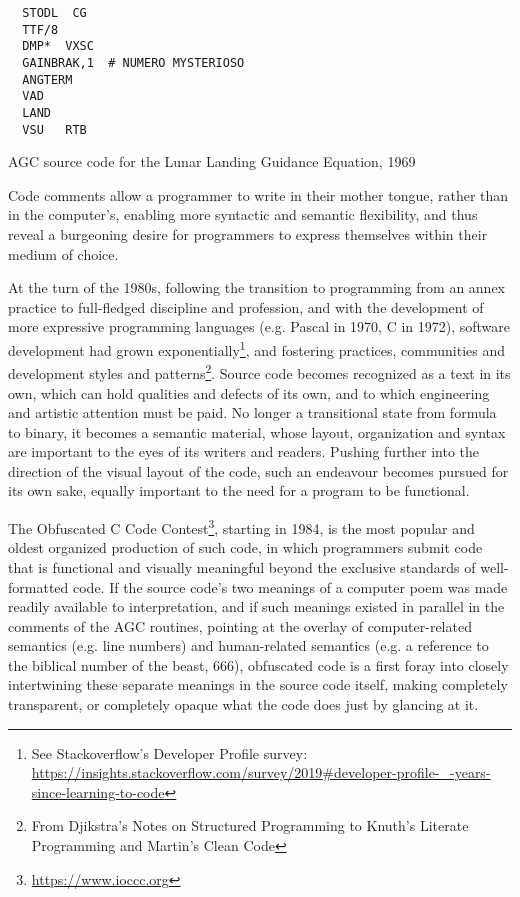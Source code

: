 \begin{listing}
  \begin{verbatim}
  STODL  CG
  TTF/8
  DMP*  VXSC
  GAINBRAK,1  # NUMERO MYSTERIOSO
  ANGTERM
  VAD
  LAND
  VSU	RTB
  \end{verbatim}
  \caption{AGC source code for the Lunar Landing Guidance Equation, 1969}
  \label{code:numero_mysterioso_asm}
\end{listing}

Code comments allow a programmer to write in their mother tongue, rather than in the computer's, enabling more syntactic and semantic flexibility, and thus reveal a burgeoning desire for programmers to express themselves within their medium of choice.

At the turn of the 1980s, following the transition to programming from an annex practice to full-fledged discipline and profession, and with the development of more expressive programming languages (e.g. Pascal in 1970, C in 1972), software development had grown exponentially\footnote{See Stackoverflow's Developer Profile survey: \url{https://insights.stackoverflow.com/survey/2019\#developer-profile-_-years-since-learning-to-code}}, and fostering practices, communities and development styles and patterns\footnote{From Djikstra's Notes on Structured Programming to Knuth's Literate Programming and Martin's Clean Code}. Source code becomes recognized as a text in its own, which can hold qualities and defects of its own, and to which engineering and artistic attention must be paid. No longer a transitional state from formula to binary, it becomes a semantic material, whose layout, organization and syntax are important to the eyes of its writers and readers. Pushing further into the direction of the visual layout of the code, such an endeavour becomes pursued for its own sake, equally important to the need for a program to be functional.

The Obfuscated C Code Contest\footnote{\url{https://www.ioccc.org}}, starting in 1984, is the most popular and oldest organized production of such code, in which programmers submit code that is functional and visually meaningful beyond the exclusive standards of well-formatted code. If the source code's two meanings of a computer poem was made readily available to interpretation, and if such meanings existed in parallel in the comments of the AGC routines, pointing at the overlay of computer-related semantics (e.g. line numbers) and human-related semantics (e.g. a reference to the biblical number of the beast, 666), obfuscated code is a first foray into closely intertwining these separate meanings in the source code itself, making completely transparent, or completely opaque what the code does just by glancing at it.

